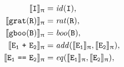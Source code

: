 \documentclass[a4paper,openany]{book}
\begin{document}
\begin{PiDen}
{ \begin{align}
%
%
\llbracket \mathtt{I} \rrbracket_\uppi & =  \mathit{id}(\mathtt{I}), \\
%
\llbracket \mathtt{grat}(\mathtt{R}) \rrbracket_\uppi & =   \mathit{rat}(\mathtt{R}), \\
%
\llbracket \mathtt{gboo}(\mathtt{B}) \rrbracket_\uppi & =   \mathit{boo}(\mathtt{B}), \\
%
\label{eq:sum}\llbracket \mathtt{E_{\mathtt{1}} ~\mbox{\tt+}~ E_{\mathtt{2}}}\rrbracket_\uppi  & =  
	\mathit{add(\llbracket \mathtt{E_{\mathtt{1}}}\rrbracket_\uppi, \llbracket \mathtt{E}_{\mathtt{2}} \rrbracket_\uppi)}, \\
%
%
\llbracket \mathtt{E_{\mathtt{1}} ~\mbox{\tt==}~ E_{\mathtt{2}}}\rrbracket_\uppi  & =  
	\mathit{eq(\llbracket \mathtt{E_{\mathtt{1}}}\rrbracket_\uppi, \llbracket \mathtt{E}_{\mathtt{2}} \rrbracket_\uppi)}, \\
%

\end{align}}
\end{PiDen}
\end{document}

